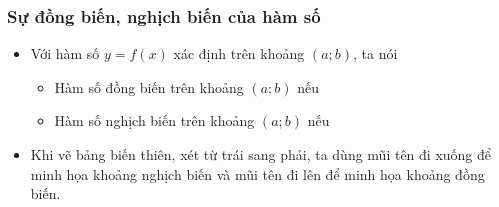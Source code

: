 \subsubsection{Sự đồng biến, nghịch biến của hàm số}
\begin{itemize}
	\item [\iconMT]  Với hàm số $y=f(x)$ xác định trên khoảng $(a;b)$, ta nói
	\begin{itemize}
		\item [\iconCH] Hàm số đồng biến trên khoảng $(a;b)$ nếu
		\item [\iconCH] Hàm số nghịch biến trên khoảng $(a;b)$ nếu
	\end{itemize}
	\item [\iconMT]  Khi vẽ bảng biến thiên, xét từ trái sang phải, ta dùng mũi tên đi xuống để minh họa khoảng nghịch biến và mũi tên đi lên để minh họa khoảng đồng biến. 
\end{itemize}
